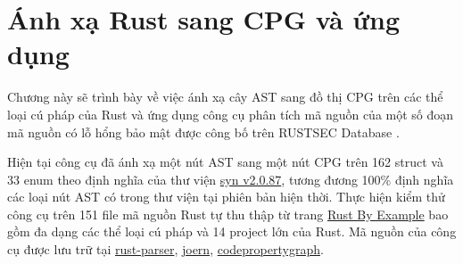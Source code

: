 \chapter{Ánh xạ Rust sang CPG và ứng dụng}
\label{chap:experiment}

Chương này sẽ trình bày về việc ánh xạ cây AST sang đồ thị CPG trên các thể loại cú pháp của Rust và ứng dụng công cụ phân tích mã nguồn của một số đoạn mã nguồn có lỗ hổng bảo mật được công bố trên RUSTSEC Database \cite{rustsecAboutRustSec}.


Hiện tại công cụ đã ánh xạ một nút AST sang một nút CPG trên 162 struct và 33 enum theo định nghĩa của thư viện \href{https://docs.rs/syn/2.0.87/syn/}{syn v2.0.87}, tương đương 100\% định nghĩa các loại nút AST có trong thư viện tại phiên bản hiện thời. Thực hiện kiểm thử công cụ trên 151 file mã nguồn Rust tự thu thập từ trang \href{https://doc.rust-lang.org/stable/rust-by-example/index.html}{Rust By Example} bao gồm đa dạng các thể loại cú pháp và  14 project lớn của Rust. Mã nguồn của công cụ được lưu trữ tại \href{https://github.com/congnghiahieu/rust-parser}{rust-parser}, \href{https://github.com/congnghiahieu/joern}{joern}, \href{https://github.com/congnghiahieu/codepropertygraph}{codepropertygraph}.







